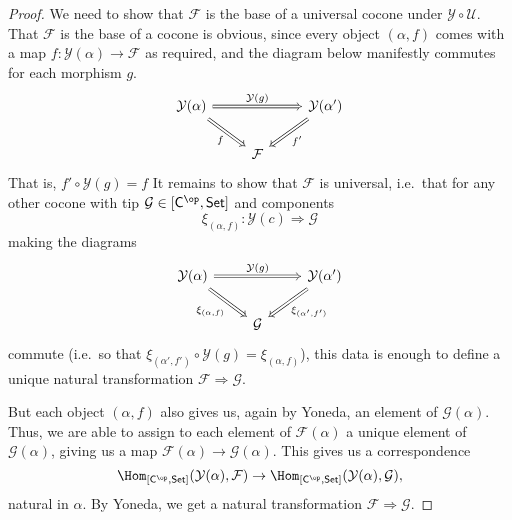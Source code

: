 \documentclass[notes.tex]{subfiles}
\begin{document}
\begin{proof}
  We need to show that $\mathcal{F}$ is the base of a universal cocone under $\mathcal{Y} \circ \mathcal{U}$. That $\mathcal{F}$ is the base of a cocone is obvious, since every object $(\alpha, f)$ comes with a map $f\colon \mathcal{Y}(\alpha) \to \mathcal{F}$ as required, and the diagram below manifestly commutes for each morphism $g$.
  \begin{equation*}
    \begin{tikzcd}
      \mathcal{Y}(\alpha)
      \arrow[rd, swap, Rightarrow, "f"]
      \arrow[rr, Rightarrow, "\mathcal{Y}(g)"]
      && \mathcal{Y}(\alpha')
      \arrow[ld, Rightarrow, "f'"]
      \\
      & \mathcal{F}
    \end{tikzcd}
  \end{equation*}
  That is, $f' \circ \mathcal{Y}(g) = f$
  It remains to show that $\mathcal{F}$ is universal, i.e.\ that for any other cocone with tip $\mathcal{G} \in [\mathsf{C}^{\op}, \mathsf{Set}]$ and components
  \begin{equation*}
    \xi_{(\alpha, f)}\colon \mathcal{Y}(c) \Rightarrow \mathcal{G}
  \end{equation*}
  making the diagrams
  \begin{equation*}
    \begin{tikzcd}
      \mathcal{Y}(\alpha)
      \arrow[rd, swap, Rightarrow, "\xi_{(\alpha, f)}"]
      \arrow[rr, Rightarrow, "\mathcal{Y}(g)"]
      && \mathcal{Y}(\alpha')
      \arrow[ld, Rightarrow, "\xi_{(\alpha', f')}"]
      \\
      & \mathcal{G}
    \end{tikzcd}
  \end{equation*}
  commute (i.e.\ so that $\xi_{(\alpha', f')} \circ \mathcal{Y}(g) = \xi_{(\alpha, f)}$), this data is enough to define a unique natural transformation $\mathcal{F} \Rightarrow \mathcal{G}$.

  But each object $(\alpha, f)$ also gives us, again by Yoneda, an element of $\mathcal{G}(\alpha)$. Thus, we are able to assign to each element of $\mathcal{F}(\alpha)$ a unique element of $\mathcal{G}(\alpha)$, giving us a map $\mathcal{F}(\alpha) \to \mathcal{G}(\alpha)$. This gives us a correspondence
  \begin{equation*}
    \Hom_{[\mathsf{C}^{\op}, \mathsf{Set}]}(\mathcal{Y}(\alpha), \mathcal{F}) \to \Hom_{[\mathsf{C}^{\op}, \mathsf{Set}]}(\mathcal{Y}(\alpha), \mathcal{G}),
  \end{equation*}
  natural in $\alpha$. By Yoneda, we get a natural transformation $\mathcal{F} \Rightarrow \mathcal{G}$.
\end{proof}
\end{document}
